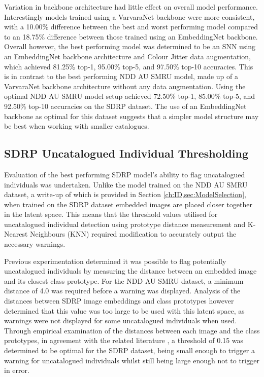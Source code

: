 Variation in backbone architecture had little effect on overall model performance. Interestingly models trained using a VarvaraNet backbone were more consistent, with a 10.00\% difference between the best and worst performing model compared to an 18.75\% difference between those trained using an EmbeddingNet backbone. Overall however, the best performing model was determined to be an SNN using an EmbeddingNet backbone architecture and Colour Jitter data augmentation, which achieved 81.25\% top-1, 95.00\% top-5, and 97.50\% top-10 accuracies. This is in contrast to the best performing NDD AU SMRU model, made up of a VarvaraNet backbone architecture without any data augmentation. Using the optimal NDD AU SMRU model setup achieved 72.50\% top-1, 85.00\% top-5, and 92.50\% top-10 accuracies on the SDRP dataset. The use of an EmbeddingNet backbone as optimal for this dataset suggests that a simpler model structure may be best when working with smaller catalogues.

\subsection{SDRP Uncatalogued Individual Thresholding}\label{ch:SNNEvaluation,sec:SDRP,sub:uncatalogued}

Evaluation of the best performing SDRP model's ability to flag uncatalogued individuals was undertaken. Unlike the model trained on the NDD AU SMRU dataset, a write-up of which is provided in Section \ref{ch:ID,sec:ModelSelection}, when trained on the SDRP dataset embedded images are placed closer together in the latent space. This means that the threshold values utilised for uncatalogued individual detection using prototype distance measurement and K-Nearest Neighbours (KNN) required modification to accurately output the necessary warnings. 

Previous experimentation determined it was possible to flag potentially uncatalogued individuals by measuring the distance between an embedded image and its closest class prototype. For the NDD AU SMRU dataset, a minimum distance of 4.0 was required before a warning was displayed. Analysis of the distances between SDRP image embeddings and class prototypes however determined that this value was too large to be used with this latent space, as warnings were not displayed for some uncatalogued individuals when used. Through empirical examination of the distances between each image and the class prototypes, in agreement with the related literature \cite{battle_siamese_2022}, a threshold of 0.15 was determined to be optimal for the SDRP dataset, being small enough to trigger a warning for uncatalogued individuals whilst still being large enough not to trigger in error.

